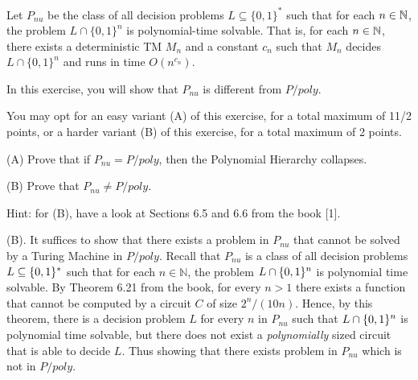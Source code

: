 \begin{question}
    Let  $P_{nu}$ be the class of all decision
    problems $L \subseteq \{0, 1\}^*$
    such that for each $n \in \mathbb{N}$,
    the problem $L \cap \{0, 1\}^n$
    is polynomial-time solvable.
    That is, for each $n \in \mathbb{N}$,
    there exists a deterministic TM $M_n$
    and a constant $c_n$ such that
    $M_n$ decides $L \cap \{0, 1\}^n$ and
    runs in time $O(n^{c_n})$.
    \par In this exercise, you will show that $P_{nu}$
    is different from $P/poly$.
    \par You may opt for an easy variant (A) of this
    exercise, for a total maximum of 11/2 points,
    or a harder variant (B) of this exercise,
    for a total maximum of 2 points.
    \par (A) Prove that if $P_{nu} = P/poly$,
    then the Polynomial Hierarchy collapses.
    \par (B) Prove that $P_{nu} \neq P/poly$.
    \par Hint: for (B), have a look at Sections 6.5 and 6.6 from the book [1].

    \begin{answer} (B).
        It suffices to show that there exists a problem in $P_{nu}$ that cannot be solved by a Turing Machine in $P/poly$. Recall that $P_{nu}$ is a class of all decision problems $L \subseteq \{0, 1\}^*$ such that for each $n \in \mathbb{N}$, the problem $L \cap \{0, 1\}^n$ is polynomial time solvable. By Theorem 6.21 from the book, for every $n > 1$ there exists a function that cannot be computed by a circuit $C$ of size $2^n/(10n)$. Hence, by this theorem, there is a decision problem $L$ for every $n$ in $P_{nu}$ such that $L \cap \{0, 1\}^n$ is polynomial time solvable, but there does not exist a \textit{polynomially} sized circuit that is able to decide $L$. Thus showing that there exists problem in $P_{nu}$ which is not in $P/poly$.
    \end{answer}
\end{question}

